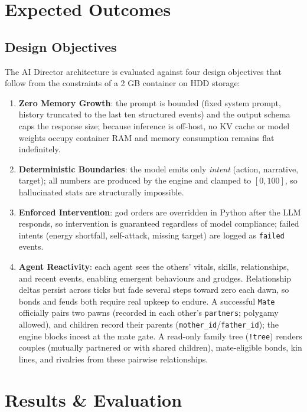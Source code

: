 \documentclass[10pt,a4paper]{article}
\begin{document}
\section{Expected Outcomes}

\subsection{Design Objectives}
The AI Director architecture is evaluated against four design objectives that follow from the constraints of a 2 GB container on HDD storage:

\begin{enumerate}
\item \textbf{Zero Memory Growth}: the prompt is bounded (fixed system prompt, history truncated to the last ten structured events) and the output schema caps the response size; because inference is off-host, no KV cache or model weights occupy container RAM and memory consumption remains flat indefinitely.
\item \textbf{Deterministic Boundaries}: the model emits only \emph{intent} (action, narrative, target); all numbers are produced by the engine and clamped to \([0,100]\), so hallucinated stats are structurally impossible.
\item \textbf{Enforced Intervention}: god orders are overridden in Python after the LLM responds, so intervention is guaranteed regardless of model compliance; failed intents (energy shortfall, self-attack, missing target) are logged as \texttt{failed} events.
\item \textbf{Agent Reactivity}: each agent sees the others' vitals, skills, relationships, and recent events, enabling emergent behaviours and grudges. Relationship deltas persist across ticks but fade several steps toward zero each dawn, so bonds and feuds both require real upkeep to endure. A successful \texttt{Mate} officially pairs two pawns (recorded in each other's \texttt{partners}; polygamy allowed), and children record their parents (\texttt{mother\_id}/\texttt{father\_id}); the engine blocks incest at the mate gate. A read-only family tree (\texttt{!tree}) renders couples (mutually partnered or with shared children), mate-eligible bonds, kin lines, and rivalries from these pairwise relationships.
\end{enumerate}

\section{Results \& Evaluation}
\end{document}

